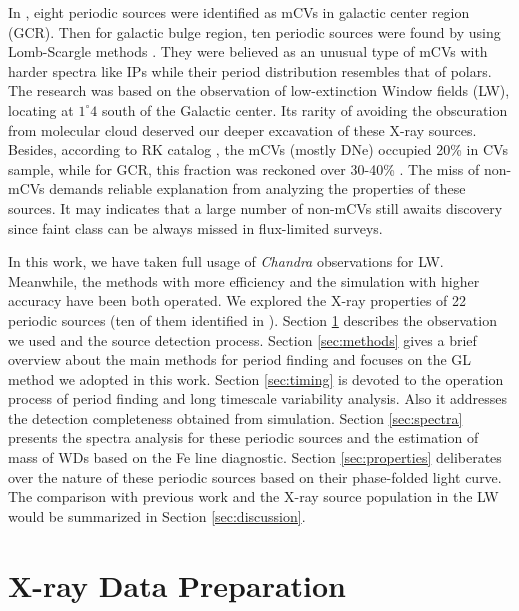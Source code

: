 \documentclass[twoside,twocolumn]{aastex63}
\begin{document}
In \citet{2003ApJ...599..465M}, eight periodic sources were identified as mCVs in galactic center region (GCR). Then for galactic bulge region, ten periodic sources were found by using Lomb-Scargle methods \citep{2012ApJ...746..165H}. They were believed as an unusual type of mCVs with harder spectra like IPs while their period distribution resembles that of polars. The research was based on the observation of low-extinction Window fields (LW), locating at $1^{\circ}4$ south of the Galactic center. Its rarity of avoiding the obscuration from molecular cloud deserved our deeper excavation of these X-ray sources. 
Besides, according to RK catalog \citep{2003A&A...404..301R}, the mCVs (mostly DNe) occupied 20\% in CVs sample, while for GCR, this fraction was reckoned over 30-40\% \citep{2016ApJ...826..160H,2012ApJ...746..165H}. The miss of non-mCVs demands reliable explanation from analyzing the properties of these sources. It may indicates that a large number of non-mCVs still awaits discovery since faint class can be always missed in flux-limited surveys.


In this work, we have taken full usage of \emph{Chandra} observations for LW. Meanwhile, the methods with more efficiency and the simulation with higher accuracy have been both operated. We explored the X-ray properties of 22 periodic sources (ten of them identified in \cite{2012ApJ...746..165H}). 
Section \ref{sec:obs} describes the observation we used and the source detection process. Section \ref{sec:methods} gives a brief overview about the main methods for period finding and focuses on the GL method we adopted in this work. Section \ref{sec:timing} is devoted to the operation process of period finding and long timescale variability analysis. Also it addresses the detection completeness obtained from simulation. Section \ref{sec:spectra} presents the spectra analysis for these periodic sources and the estimation of mass of WDs based on the Fe line diagnostic. Section \ref{sec:properties} deliberates over the nature of these periodic sources based on their phase-folded light curve. The comparison with previous work and the X-ray source population in the LW would be summarized in Section \ref{sec:discussion}.

\section{X-ray Data Preparation} \label{sec:obs}
\end{document}
